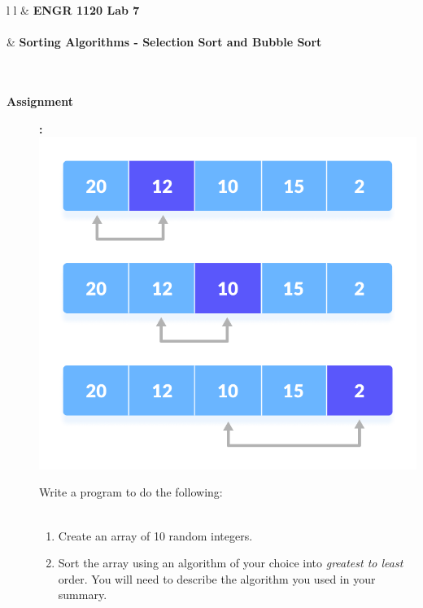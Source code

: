 \documentclass[11pt]{article}
\newcommand{\NUM}{7}
\begin{document}
	\begin{tabular}{ l l }
  &\vspace{3mm} \textbf{ \LARGE ENGR 1120 Lab \NUM } \\\\
  & \textbf{\LARGE Sorting Algorithms - Selection Sort and Bubble Sort} \\\\\\
\end{tabular}
		
	\begin{description}
		
	
        
        \item [\textbf{Assignment}]\textbf{:} \\            
            
\includegraphics[scale=0.75]{lab7_fig1.png}

            Write a program to do the following:\\\\
            \begin{enumerate}
	
		\item Create an array of 10 random integers.		\\

                \item Sort the array using an algorithm of your choice into {\it greatest to least} order. You will need to describe the algorithm you used in your summary.\\
                

\end{enumerate}
\end{description}
\end{document}
